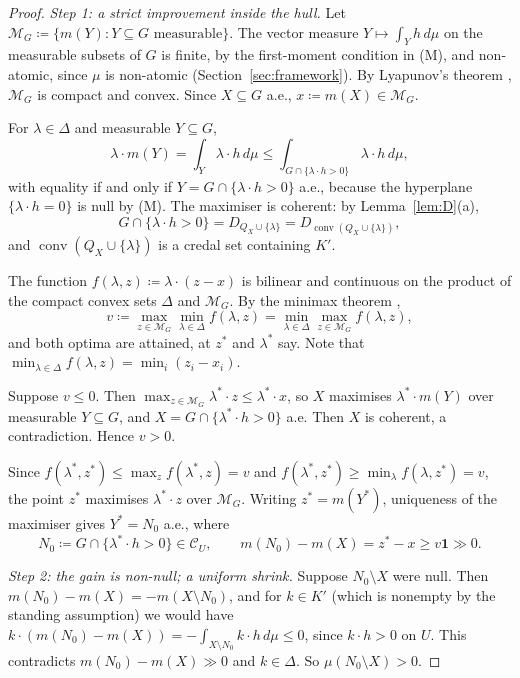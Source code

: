 \documentclass[11pt]{article}
\newcommand{\one}{\mathbf{1}}
\newcommand{\M}{\mathcal{M}}
\newcommand{\CC}{\mathcal{C}}
\DeclareMathOperator{\conv}{conv}
\theoremstyle{plain}
\theoremstyle{definition}
\theoremstyle{remark}
\begin{document}
\begin{proof}
\emph{Step 1: a strict improvement inside the hull.} Let $\M_G\coloneqq\{m(Y):Y
\subseteq G\text{ measurable}\}$. The vector measure $Y\mapsto\int_Yh\,d\mu$ on the
measurable subsets of $G$ is finite, by the first-moment condition in (M), and
non-atomic, since $\mu$ is non-atomic (Section~\ref{sec:framework}). By Lyapunov's theorem
\cite{Lyapunov,Lindenstrauss}, $\M_G$ is compact and convex. Since $X\subseteq G$ a.e.,
$x\coloneqq m(X)\in\M_G$.

For $\lambda\in\Delta$ and measurable $Y\subseteq G$,
\[
  \lambda\cdot m(Y)=\int_Y\lambda\cdot h\,d\mu\le\int_{G\cap\{\lambda\cdot h>0\}}
  \lambda\cdot h\,d\mu ,
\]
with equality if and only if $Y=G\cap\{\lambda\cdot h>0\}$ a.e., because the hyperplane
$\{\lambda\cdot h=0\}$ is null by (M). The maximiser is coherent: by
Lemma~\ref{lem:D}(a),
\[
  G\cap\{\lambda\cdot h>0\}=D_{Q_X\cup\{\lambda\}}=D_{\conv(Q_X\cup\{\lambda\})},
\]
and $\conv(Q_X\cup\{\lambda\})$ is a credal set containing $K'$.

The function $f(\lambda,z)\coloneqq\lambda\cdot(z-x)$ is bilinear and continuous on the
product of the compact convex sets $\Delta$ and $\M_G$. By the minimax theorem
\cite{Sion},
\[
  v\coloneqq\max_{z\in\M_G}\min_{\lambda\in\Delta}f(\lambda,z)
  =\min_{\lambda\in\Delta}\max_{z\in\M_G}f(\lambda,z),
\]
and both optima are attained, at $z^\ast$ and $\lambda^\ast$ say. Note that
$\min_{\lambda\in\Delta}f(\lambda,z)=\min_i(z_i-x_i)$.

Suppose $v\le0$. Then $\max_{z\in\M_G}\lambda^\ast\cdot z\le\lambda^\ast\cdot x$, so $X$
maximises $\lambda^\ast\cdot m(Y)$ over measurable $Y\subseteq G$, and $X=G\cap
\{\lambda^\ast\cdot h>0\}$ a.e. Then $X$ is coherent, a contradiction. Hence $v>0$.

Since $f(\lambda^\ast,z^\ast)\le\max_zf(\lambda^\ast,z)=v$ and $f(\lambda^\ast,z^\ast)
\ge\min_\lambda f(\lambda,z^\ast)=v$, the point $z^\ast$ maximises $\lambda^\ast\cdot z$
over $\M_G$. Writing $z^\ast=m(Y^\ast)$, uniqueness of the maximiser gives
$Y^\ast=N_0$ a.e., where
\[
  N_0\coloneqq G\cap\{\lambda^\ast\cdot h>0\}\in\CC_U,\qquad
  m(N_0)-m(X)=z^\ast-x\ge v\one\gg0 .
\]

\emph{Step 2: the gain is non-null; a uniform shrink.} Suppose $N_0\setminus X$ were
null. Then $m(N_0)-m(X)=-m(X\setminus N_0)$, and for $k\in K'$ (which is nonempty by the
standing assumption) we would have $k\cdot(m(N_0)-m(X))=-\int_{X\setminus N_0}k\cdot
h\,d\mu\le0$, since $k\cdot h>0$ on $U$. This contradicts $m(N_0)-m(X)\gg0$ and
$k\in\Delta$. So $\mu(N_0\setminus X)>0$.


\end{proof}
\end{document}
